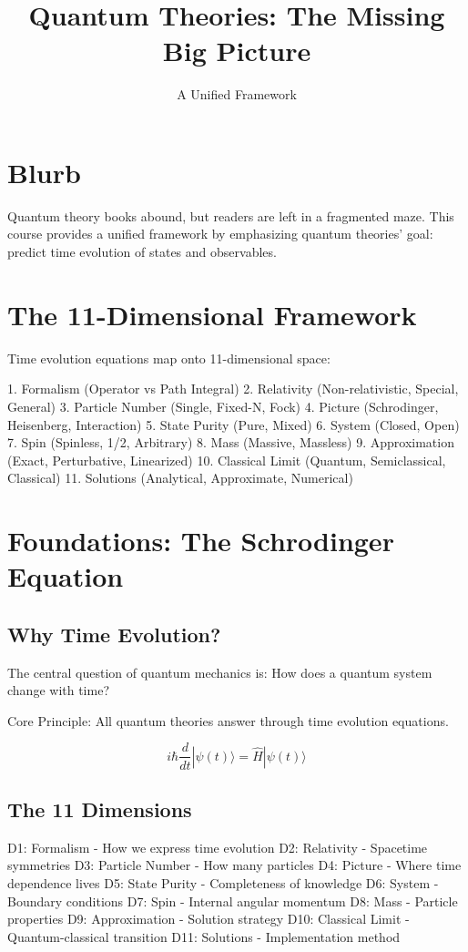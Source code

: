 \documentclass[12pt]{article}
\title{Quantum Theories: The Missing Big Picture}
\author{A Unified Framework}
\date{}
\begin{document}
\maketitle

\section*{Blurb}

Quantum theory books abound, but readers are left in a fragmented maze. This course provides a unified framework by emphasizing quantum theories' goal: predict time evolution of states and observables.

\section*{The 11-Dimensional Framework}

Time evolution equations map onto 11-dimensional space:

1. Formalism (Operator vs Path Integral)
2. Relativity (Non-relativistic, Special, General)
3. Particle Number (Single, Fixed-N, Fock)
4. Picture (Schrodinger, Heisenberg, Interaction)
5. State Purity (Pure, Mixed)
6. System (Closed, Open)
7. Spin (Spinless, 1/2, Arbitrary)
8. Mass (Massive, Massless)
9. Approximation (Exact, Perturbative, Linearized)
10. Classical Limit (Quantum, Semiclassical, Classical)
11. Solutions (Analytical, Approximate, Numerical)

\section{Foundations: The Schrodinger Equation}

\subsection{Why Time Evolution?}

The central question of quantum mechanics is: How does a quantum system change with time?

Core Principle: All quantum theories answer through time evolution equations.

\[
i\hbar\frac{d}{dt}|\psi(t)\rangle = \hat{H}|\psi(t)\rangle
\]

\subsection{The 11 Dimensions}

D1: Formalism - How we express time evolution
D2: Relativity - Spacetime symmetries
D3: Particle Number - How many particles
D4: Picture - Where time dependence lives
D5: State Purity - Completeness of knowledge
D6: System - Boundary conditions
D7: Spin - Internal angular momentum
D8: Mass - Particle properties
D9: Approximation - Solution strategy
D10: Classical Limit - Quantum-classical transition
D11: Solutions - Implementation method
\end{document}
